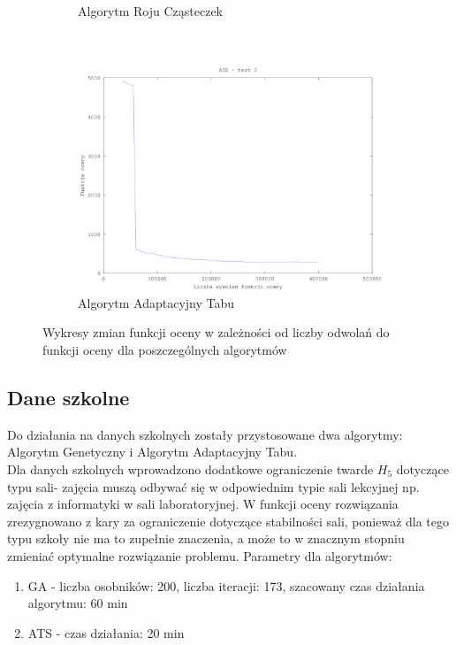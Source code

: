 \begin{figure}[H]
\begin{subfigure}[b]{0.5\textwidth}
                \caption{Algorytm Roju Cząsteczek}
        \end{subfigure}
        ~ %
          \\
        \begin{subfigure}[b]{0.5\textwidth}
                \includegraphics[width=\textwidth]{ats_test_3.png}
                \caption{Algorytm Adaptacyjny Tabu}
        \end{subfigure}
        \caption{Wykresy zmian funkcji oceny w zależności od liczby odwolań do funkcji oceny dla poszczególnych algorytmów}
\end{figure}
\subsection{Dane szkolne}
Do działania na danych szkolnych zostały przystosowane dwa algorytmy: Algorytm Genetyczny i Algorytm Adaptacyjny Tabu. \\
Dla danych szkolnych wprowadzono dodatkowe ograniczenie twarde ${H_{5}}$ dotyczące typu sali- zajęcia muszą odbywać się w odpowiednim typie sali lekcyjnej np. zajęcia z informatyki w sali laboratoryjnej. W funkcji oceny rozwiązania zrezygnowano z kary za ograniczenie dotyczące stabilności sali, ponieważ dla tego typu szkoły nie ma to zupełnie znaczenia, a może to w znacznym stopniu zmieniać optymalne rozwiązanie problemu.
Parametry dla algorytmów:
\begin{enumerate}
\item GA - liczba osobników: 200, liczba iteracji: 173, szacowany czas działania algorytmu: 60 min
\item ATS - czas działania: 20 min
\end{enumerate}

